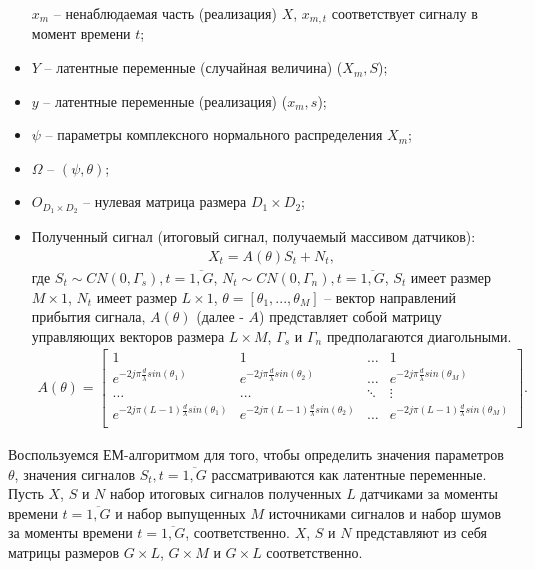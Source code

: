 \documentclass[11pt]{article}
\begin{document}
\begin{itemize}
$x_m$ -- ненаблюдаемая часть (реализация) $X$, $x_{m,t}$ соответствует сигналу в момент времени $t$;
\item
$Y$ -- латентные переменные (случайная величина) ($X_m, S$);
\item
$y$ -- латентные переменные (реализация) ($x_m, s$);
\item
$\psi$ -- параметры комплексного нормального распределения $X_m$;
\item
$\Omega$ -- $(\psi, \theta)$;
\item
$O_{D_1 \times D_2}$ -- нулевая матрица размера $D_1 \times D_2$;
\item
Полученный сигнал (итоговый сигнал, получаемый массивом датчиков):
\begin{equation}
\begin{gathered}
X_t=A(\theta)S_t+N_t,
\end{gathered}
\end{equation}
где $S_t \sim CN(0,\Gamma_s),t=\overline{1,G}$, $N_t \sim CN(0,\Gamma_n), t=\overline{1,G}$, $S_t$ имеет размер $M \times 1$,  $N_t$ имеет размер $L \times 1$, $\theta=[\theta_1,...,\theta_M]$ -- вектор направлений прибытия сигнала, $A(\theta)$ (далее - $A$) представляет собой матрицу управляющих векторов размера $L \times M$, $\Gamma_s$ и $\Gamma_n$ предполагаются диагольными.
\begin{gather}
A(\theta) = \begin{bmatrix}
1&1&\dots&1\\
e^{-2j\pi \frac{d}{\lambda}sin(\theta_1)}& e^{-2j\pi \frac{d}{\lambda}sin(\theta_2)}&\dots&e^{-2j\pi \frac{d}{\lambda}sin(\theta_M)}\\
\dots&\dots&\ddots&\vdots\\
e^{-2j\pi (L-1) \frac{d}{\lambda}sin(\theta_1)}& e^{-2j\pi (L-1) \frac{d}{\lambda}sin(\theta_2)}&\dots&e^{-2j\pi (L-1) \frac{d}{\lambda}sin(\theta_M)}\\
\end{bmatrix}.
\nonumber
\end{gather}
\end{itemize}
Воспользуемся ЕМ-алгоритмом для того, чтобы определить значения параметров $\theta$, значения сигналов $S_t, t=\overline{1,G}$ рассматриваются как латентные переменные. 
Пусть $X$, $S$ и $N$ набор итоговых сигналов полученных $L$ датчиками за моменты времени $t=\overline{1,G}$ и набор выпущенных $M$ источниками сигналов и набор шумов за моменты времени $t=\overline{1,G}$, соответственно. $X$, $S$ и $N$ представляют из себя матрицы размеров $G \times L$, $G \times M$ и $G \times L$ соответственно.
\end{document}
